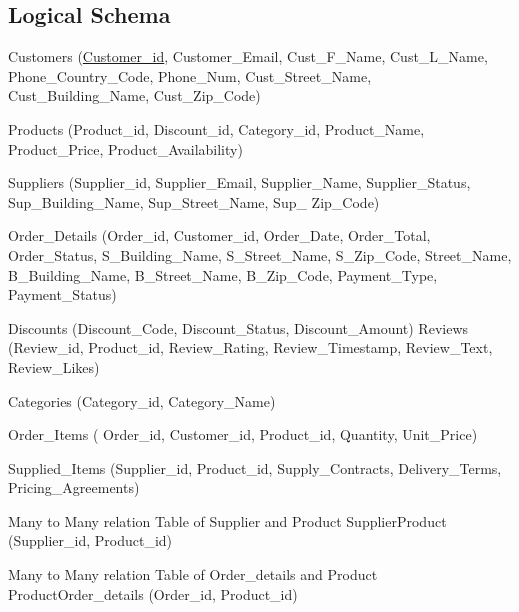 \documentclass[
]{article}
\begin{document}
\hypertarget{logical-schema}{%
\subsection{Logical Schema}\label{logical-schema}}

Customers (\underline{Customer_id}, Customer\_Email, Cust\_F\_Name,
Cust\_L\_Name, Phone\_Country\_Code, Phone\_Num, Cust\_Street\_Name,
Cust\_Building\_Name, Cust\_Zip\_Code)

Products (Product\_id, Discount\_id, Category\_id, Product\_Name,
Product\_Price, Product\_Availability)

Suppliers (Supplier\_id, Supplier\_Email, Supplier\_Name,
Supplier\_Status, Sup\_Building\_Name, Sup\_Street\_Name, Sup\_
Zip\_Code)

Order\_Details (Order\_id, Customer\_id, Order\_Date, Order\_Total,
Order\_Status, S\_Building\_Name, S\_Street\_Name, S\_Zip\_Code,
Street\_Name, B\_Building\_Name, B\_Street\_Name, B\_Zip\_Code,
Payment\_Type, Payment\_Status)

Discounts (Discount\_Code, Discount\_Status, Discount\_Amount) Reviews
(Review\_id, Product\_id, Review\_Rating, Review\_Timestamp,
Review\_Text, Review\_Likes)

Categories (Category\_id, Category\_Name)

Order\_Items ( Order\_id, Customer\_id, Product\_id, Quantity,
Unit\_Price)

Supplied\_Items (Supplier\_id, Product\_id, Supply\_Contracts,
Delivery\_Terms, Pricing\_Agreements)

Many to Many relation Table of Supplier and Product SupplierProduct
(Supplier\_id, Product\_id)

Many to Many relation Table of Order\_details and Product
ProductOrder\_details (Order\_id, Product\_id)
\end{document}
